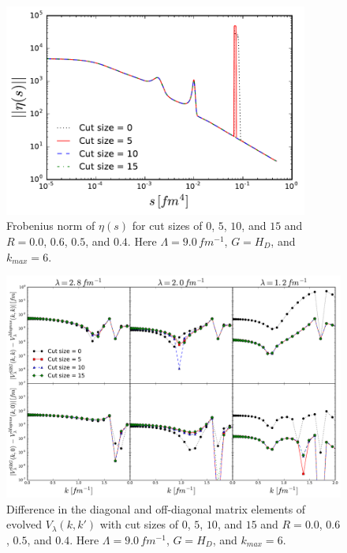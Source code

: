 \documentclass[preprintnumbers,floatfix,aps,prc,preprint]{revtex4-1}
\begin{document}
%
\begin{figure}[H]
  \centering
  \includegraphics[width=10cm]{reduced_matrix_eta_norms_V9}
   \hspace*{0.05\textwidth}%
  \caption{Frobenius norm of $\eta(s)$ for cut sizes of $0$, $5$, $10$, and $15$ and $R=0.0$, $0.6$, $0.5$, and $0.4$. Here $\Lambda=9.0 \, fm^{-1}$, $G=H_D$, and $k_{max}=6$.}
  \label{fig:reduced_matrix_eta_norms_V9}
\end{figure}
%
\newpage
%
\begin{figure}[H]
  \centering
  \includegraphics[width=15cm]{reduced_matrix_mag_diff_V9}
   \hspace*{0.05\textwidth}%
  \caption{Difference in the diagonal and off-diagonal matrix elements of evolved $V_{\lambda}(k,k')$ with cut sizes of $0$, $5$, $10$, and $15$ and $R=0.0$, $0.6$, $0.5$, and $0.4$. Here $\Lambda=9.0 \, fm^{-1}$, $G=H_D$, and $k_{max}=6$.}
  \label{fig:reduced_matrix_mag_diff_V9}
\end{figure}
%
\end{document}
